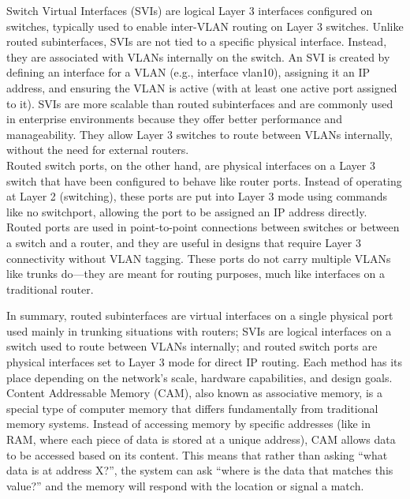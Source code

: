 \documentclass[parindent=0pt]{article}
\begin{document}
Switch Virtual Interfaces (SVIs) are logical Layer 3 interfaces configured on switches, typically used to enable inter-VLAN routing on Layer 3 switches. Unlike routed subinterfaces, SVIs are not tied to a specific physical interface. Instead, they are associated with VLANs internally on the switch. An SVI is created by defining an interface for a VLAN (e.g., interface vlan10), assigning it an IP address, and ensuring the VLAN is active (with at least one active port assigned to it). SVIs are more scalable than routed subinterfaces and are commonly used in enterprise environments because they offer better performance and manageability. They allow Layer 3 switches to route between VLANs internally, without the need for external routers.\\

Routed switch ports, on the other hand, are physical interfaces on a Layer 3 switch that have been configured to behave like router ports. Instead of operating at Layer 2 (switching), these ports are put into Layer 3 mode using commands like no switchport, allowing the port to be assigned an IP address directly. Routed ports are used in point-to-point connections between switches or between a switch and a router, and they are useful in designs that require Layer 3 connectivity without VLAN tagging. These ports do not carry multiple VLANs like trunks do—they are meant for routing purposes, much like interfaces on a traditional router.

In summary, routed subinterfaces are virtual interfaces on a single physical port used mainly in trunking situations with routers; SVIs are logical interfaces on a switch used to route between VLANs internally; and routed switch ports are physical interfaces set to Layer 3 mode for direct IP routing. Each method has its place depending on the network’s scale, hardware capabilities, and design goals.\\

Content Addressable Memory (CAM), also known as associative memory, is a special type of computer memory that differs fundamentally from traditional memory systems. Instead of accessing memory by specific addresses (like in RAM, where each piece of data is stored at a unique address), CAM allows data to be accessed based on its content. This means that rather than asking “what data is at address X?”, the system can ask “where is the data that matches this value?” and the memory will respond with the location or signal a match.\\
\end{document}
